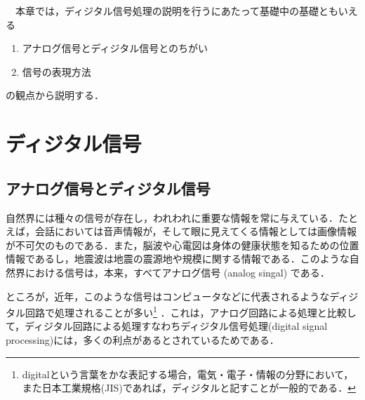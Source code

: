 

\begin{lead}
　本章では，ディジタル信号処理の説明を行うにあたって基礎中の基礎ともいえる
\begin{enumerate}
\item アナログ信号とディジタル信号とのちがい
\item 信号の表現方法
\end{enumerate}
の観点から説明する．


\vfill


\end{lead}


\chapter{ディジタル信号}

\label{chapter:3}




\section{アナログ信号とディジタル信号}

自然界には種々の信号が存在し，われわれに重要な情報を常に与えている．たとえば，会話においては音声情報が，そして眼に見えてくる情報としては画像情報が不可欠のものである．また，脳波や心電図は身体の健康状態を知るための位置情報であるし，地震波は地震の震源地や規模に関する情報である．このような自然界における信号は，本来，すべてアナログ信号 (analog singal) である．

ところが，近年，このような信号はコンピュータなどに代表されるようなディジタル回路で処理されることが多い\footnote{digitalという言葉をかな表記する場合，電気・電子・情報の分野において，また日本工業規格(JIS)であれば，ディジタルと記すことが一般的である．}
．これは，アナログ回路による処理と比較して，ディジタル回路による処理すなわちディジタル信号処理(digital signal processing)には，多くの利点があるとされているためである．

